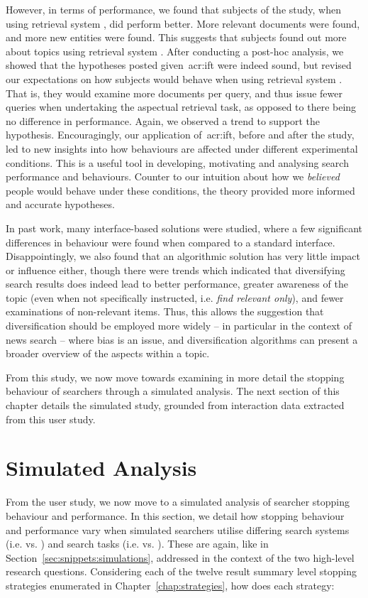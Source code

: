 However, in terms of performance, we found that subjects of the study, when using retrieval system , did perform better. More relevant documents were found, and more new entities were found. This suggests that subjects found out more about topics using retrieval system . After conducting a post-hoc analysis, we showed that the hypotheses posted given~\gls{acr:ift} were indeed sound, but revised our expectations on how subjects would behave when using retrieval system . That is, they would examine more documents per query, and thus issue fewer queries when undertaking the aspectual retrieval task, as opposed to there being no difference in performance. Again, we observed a trend to support the hypothesis. Encouragingly, our application of~\gls{acr:ift}, before and after the study, led to new insights into how behaviours are affected under different experimental conditions. This is a useful tool in developing, motivating and analysing search performance and behaviours. Counter to our intuition about how we \emph{believed} people would behave under these conditions, the theory provided more informed and accurate hypotheses.

In past work, many interface-based solutions were studied, where a few significant differences in behaviour were found when compared to a standard interface. Disappointingly, we also found that an algorithmic solution has very little impact or influence either, though there were trends which indicated that diversifying search results does indeed lead to better performance, greater awareness of the topic (even when not specifically instructed, i.e. \emph{find relevant only}), and fewer examinations of non-relevant items. Thus, this allows the suggestion that diversification should be employed more widely -- in particular in the context of news search -- where bias is an issue, and diversification algorithms can present a broader overview of the aspects within a topic.

From this study, we now move towards examining in more detail the stopping behaviour of searchers through a simulated analysis. The next section of this chapter details the simulated study, grounded from interaction data extracted from this user study.

\section{Simulated Analysis}\label{sec:diversity:simulated}
From the user study, we now move to a simulated analysis of searcher stopping behaviour and performance. In this section, we detail how stopping behaviour and performance vary when simulated searchers utilise differing search systems (i.e.  vs. ) and search tasks (i.e.  vs. ). These are again, like in Section~\ref{sec:snippets:simulations}, addressed in the context of the two high-level research questions. Considering each of the twelve result summary level stopping strategies enumerated in Chapter~\ref{chap:strategies}, how does each strategy:

